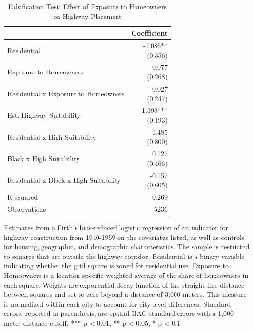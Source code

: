 \begin{table}[h]
\centering
\caption{Falsification Test: Effect of Exposure to Homeowners on Highway Placement}
\label{tab:robustness/falsification_homeowners}
\begin{threeparttable}
\begin{tabular*}{0.6\textwidth}{@{\extracolsep{\fill}}l*{1}{r}}
\toprule
 & Coefficient \\
\midrule
Residential & \makecell[tr]{-1.086{**} \\ (0.356)} \\
Exposure to Homeowners & \makecell[tr]{0.077 \\ (0.268)} \\
Residential x Exposure to Homeowners & \makecell[tr]{0.027 \\ (0.247)} \\
Est. Highway Suitability & \makecell[tr]{1.398{***} \\ (0.193)} \\
Residential x High Suitability & \makecell[tr]{1.485 \\ (0.800)} \\
Black x High Suitability & \makecell[tr]{0.127 \\ (0.466)} \\
Residential x Black x High Suitability & \makecell[tr]{-0.157 \\ (0.605)} \\
R-squared & 0.269 \\
Observations & 5236 \\
\bottomrule
\end{tabular*}
\begin{tablenotes}[flushleft]
\footnotesize
\item Estimates from a Firth's bias-reduced logistic regression of an indicator for highway construction from 1940-1959 on the covariates listed, as well as controls for housing, geographic, and demographic characteristics. The sample is restricted to squares that are outside the highway corridor. Residential is a binary variable indicating whether the grid square is zoned for residential use. Exposure to Homeowners is a location-specific weighted average of the share of homeowners in each square. Weights are exponential decay function of the straight-line distance between squares and set to zero beyond a distance of 3,000 meters. This measure is normalized within each city to account for city-level differences. Standard errors, reported in parenthesis, are \textcite{conley_gmm_1999} spatial HAC standard errors with a 1,000-meter distance cutoff. *** p < 0.01, ** p < 0.05, * p < 0.1
\end{tablenotes}
\end{threeparttable}
\end{table}
